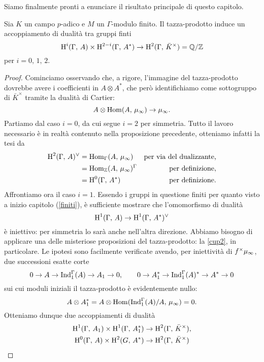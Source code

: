 \pagebreak
Siamo finalmente pronti a enunciare il risultato principale di questo capitolo.
\begin{theorem}
	Sia $ K $ un campo $ p $-adico e $ M $ un $ \Gamma $-modulo finito. Il tazza-prodotto induce un accoppiamento di dualità tra gruppi finti
	\[ \operatorname{H}^i(\Gamma, \, A) \times \operatorname{H}^{2-i}(\Gamma, \, A^*) \to \operatorname{H}^2(\Gamma, \, \bar{K}^\times) = \mathbb{Q} / \mathbb{Z} \]
	per $ i = 0, \, 1, \, 2 $.
\end{theorem}


\begin{proof}
	Cominciamo osservando che, a rigore, l'immagine del tazza-prodotto dovrebbe avere i coefficienti in $ A \otimes A^* $, che però identifichiamo come sottogruppo di $ \bar{K}^\times $ tramite la dualità di Cartier:
	\[ A \otimes \operatorname{Hom}(A,\, \mu_\infty) \to \mu_\infty. \]
	Partiamo dal caso $ i = 0 $, da cui segue $ i = 2 $ per simmetria. Tutto il lavoro necessario è in realtà contenuto nella proposizione precedente, otteniamo infatti la tesi da
	\begin{align*}
	\operatorname{H}^2(\Gamma, \, A)^\vee & = \operatorname{Hom}_\Gamma(A, \, \mu_\infty) & \text{per via del dualizzante,} \\
	& = \operatorname{Hom}_{\mathbb{Z}}(A, \, \mu_\infty)^\Gamma & \text{per definizione,} \\
	& = \operatorname{H}^0(\Gamma, \, A^*) & \text{per definizione.}
	\end{align*}
	Affrontiamo ora il caso $ i = 1 $. Essendo i gruppi in questione finiti per quanto visto a inizio capitolo (\ref{finiti}), è sufficiente mostrare che l'omomorfismo di dualità
	\[ \operatorname{H}^1(\Gamma, \, A) \to \operatorname{H}^1(\Gamma, \, A^*)^\vee \]
	è iniettivo: per simmetria lo sarà anche nell'altra direzione. Abbiamo bisogno di applicare una delle misteriose proposizioni del tazza-prodotto: la \ref{cup2}, in particolare. Le ipotesi sono facilmente verificate avendo, per iniettività di $ f^\times\mu_\infty $, due successioni esatte corte
	\[ 0 \to A \to \operatorname{Ind}_1^\Gamma(A) \to A_1 \to 0, \qquad 0 \to A_1^* \to \operatorname{Ind}_1^\Gamma(A)^* \to A^* \to 0 \]
	sui cui moduli iniziali il tazza-prodotto è evidentemente nullo:
	\[ A \otimes A_1^* = A \otimes \operatorname{Hom}(\operatorname{Ind}_1^\Gamma(A)/A, \, \mu_\infty) = 0. \]
	Otteniamo dunque due accoppiamenti di dualità 
	\begin{align*}
	\HH^{1}(\Gamma, \, A_1) \times \HH^{1}(\Gamma, \, A_1^*) &\to \HH^{2}(\Gamma, \, \bar{K}^\times),\\
	\HH^{0}(\Gamma, \, A) \times \HH^{2}(G, \, A^*) &\to \HH^{2}(\Gamma, \, \bar{K}^\times)

\end{align*}
\end{proof}
